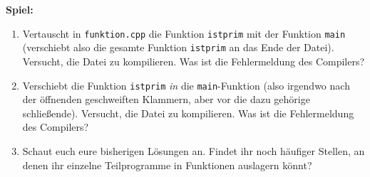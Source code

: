 \textbf{Spiel:}
\begin{enumerate}
    \item Vertauscht in \texttt{funktion.cpp} die Funktion \texttt{istprim} mit
        der Funktion \texttt{main} (verschiebt also die gesamte Funktion
        \texttt{istprim} an das Ende der Datei). Versucht, die Datei zu
        kompilieren. Was ist die Fehlermeldung des Compilers?
    \item Verschiebt die Funktion \texttt{istprim} \emph{in} die
        \texttt{main}-Funktion (also irgendwo nach der öffnenden geschweiften
        Klammern, aber vor die dazu gehörige schließende). Versucht, die Datei
        zu kompilieren. Was ist die Fehlermeldung des Compilers?
    \item Schaut euch eure bisherigen Lösungen an. Findet ihr noch häufiger
        Stellen, an denen ihr einzelne Teilprogramme in Funktionen auslagern
        könnt?
\end{enumerate}
